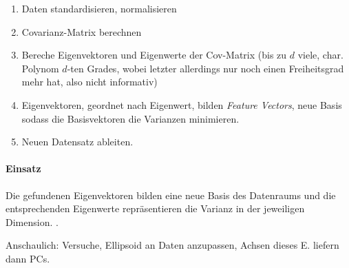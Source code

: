 \documentclass[10pt]{article} %
\begin{document}
\begin{enumerate}
	\item Daten standardisieren, normalisieren
	\item Covarianz-Matrix berechnen
	\item Bereche Eigenvektoren und Eigenwerte der Cov-Matrix (bis zu
	$d$ viele, char. Polynom $d$-ten Grades, wobei letzter allerdings
	nur noch einen Freiheitsgrad mehr hat, also nicht informativ)
	\item Eigenvektoren, geordnet nach Eigenwert, bilden 
	\textit{Feature Vectors}, neue Basis sodass die Basisvektoren die
	Varianzen minimieren.
	\item Neuen Datensatz ableiten.
\end{enumerate}


\paragraph{Einsatz} Die gefundenen Eigenvektoren bilden eine neue Basis des Datenraums und die entsprechenden Eigenwerte repräsentieren die Varianz in der jeweiligen Dimension. .

Anschaulich: Versuche, Ellipsoid an Daten anzupassen, Achsen dieses E. liefern dann PCs.
\end{document}
